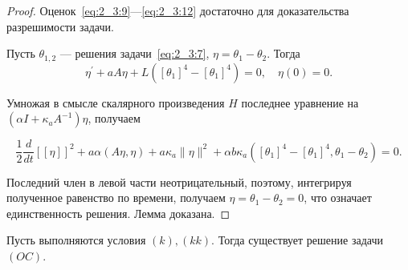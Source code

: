 \begin{proof}
    Оценок~\eqref{eq:2_3:9}—\eqref{eq:2_3:12} достаточно
    для доказательства разрешимости задачи.

    Пусть $\theta_{1,2}$ — решения задачи~\eqref{eq:2_3:7},
    $\eta=\theta_{1}-\theta_{2}.$
    Тогда
    \[
        \eta^{\prime}+a A \eta+L\left(\left[\theta_{1}\right]^{4}-
        \left[\theta_{1}\right]^{4}\right)=0, \quad \eta(0)=0.
    \]


    Умножая в смысле скалярного произведения $H$ последнее уравнение на
    $\left(\alpha I+\kappa_{a} A^{-1}\right) \eta$, получаем

    \[
        \frac{1}{2} \frac{d}{d t}[[\eta]]^{2}+a \alpha(A \eta, \eta)
        + a \kappa_{a}\|\eta\|^{2}+\alpha b
        \kappa_{a}\left(\left[\theta_{1}\right]^{4}
        -\left[\theta_{1}\right]^{4}, \theta_{1}-\theta_{2}\right) = 0.
    \]


    Последний член в левой части неотрицательный,
    поэтому, интегрируя полученное равенство по времени,
    получаем $\eta=\theta_{1}-\theta_{2}=0$, что означает единственность решения.
    Лемма доказана.
\end{proof}

\begin{theorem}
    \label{th:2_3:1}
    Пусть выполняются условия $(k), (kk)$.
    Тогда существует решение задачи $(OC)$.
\end{theorem}



